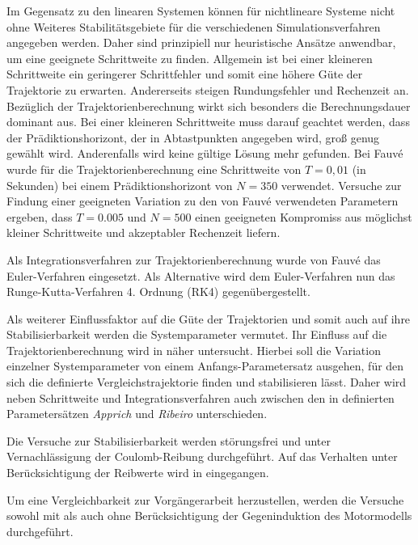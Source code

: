 Im Gegensatz zu den linearen Systemen können für nichtlineare Systeme nicht ohne Weiteres Stabilitätsgebiete für die verschiedenen Simulationsverfahren angegeben werden. Daher sind prinzipiell nur heuristische Ansätze anwendbar, um eine geeignete Schrittweite zu finden. Allgemein ist bei einer kleineren Schrittweite ein geringerer Schrittfehler und somit eine höhere Güte der Trajektorie zu erwarten. Andererseits steigen Rundungsfehler und Rechenzeit an. Bezüglich der Trajektorienberechnung wirkt sich besonders die Berechnungsdauer dominant aus. Bei einer kleineren Schrittweite muss darauf geachtet werden, dass der Prädiktionshorizont, der in Abtastpunkten angegeben wird, groß genug gewählt wird. Anderenfalls wird keine gültige Lösung mehr gefunden. Bei Fauvé \cite{fauve} wurde für die Trajektorienberechnung eine Schrittweite von $T=0,01$ (in Sekunden) bei einem Prädiktionshorizont von $N=350$ verwendet. Versuche zur Findung einer geeigneten Variation zu den von Fauvé \cite{fauve} verwendeten Parametern ergeben, dass $T=0.005$ und $N=500$ einen geeigneten Kompromiss aus möglichst kleiner Schrittweite und akzeptabler Rechenzeit liefern. 

Als Integrationsverfahren zur Trajektorienberechnung wurde von Fauvé \cite{fauve} das Euler-Verfahren eingesetzt. Als Alternative wird dem Euler-Verfahren nun das Runge-Kutta-Verfahren 4. Ordnung (RK4) gegenübergestellt.

Als weiterer Einflussfaktor auf die Güte der Trajektorien und somit auch auf ihre Stabilisierbarkeit werden die Systemparameter vermutet. Ihr Einfluss auf die Trajektorienberechnung wird in  näher untersucht. Hierbei soll die Variation einzelner Systemparameter von einem Anfangs-Parametersatz ausgehen, für den sich die definierte Vergleichstrajektorie finden und stabilisieren lässt. Daher wird neben Schrittweite und Integrationsverfahren auch zwischen den in  definierten Parametersätzen \textit{Apprich} und \textit{Ribeiro} unterschieden.

Die Versuche zur Stabilisierbarkeit werden störungsfrei und unter Vernachlässigung der Coulomb-Reibung durchgeführt. Auf das Verhalten unter Berücksichtigung der Reibwerte wird in  eingegangen. 

Um eine Vergleichbarkeit zur Vorgängerarbeit herzustellen, werden die Versuche sowohl mit als auch ohne Berücksichtigung der Gegeninduktion des Motormodells durchgeführt. 

